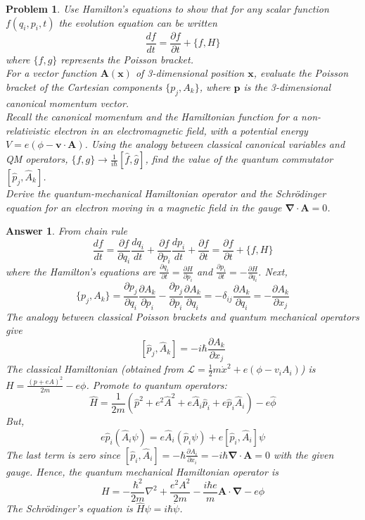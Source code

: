 \documentclass[a4paper]{article}
\newtheorem{ans}{Answer}[section]
\theoremstyle{new}
\newtheorem{qns}{Problem}[section]
\begin{document}
\begin{qns}
Use Hamilton’s equations to show that for any scalar function $f(q_i, p_i,t)$ the evolution equation can be written
$$\frac{df}{dt}=\frac{\partial f}{\partial t}+\{f,H\}$$
where $\{f,g\}$ represents the Poisson bracket.\\[5pt]
For a vector function $\mathbf{A}(\mathbf{x})$ of 3-dimensional position $\mathbf{x}$, evaluate the Poisson bracket of the Cartesian components $\{p_j,A_k\}$, where $\mathbf{p}$ is the 3-dimensional canonical momentum vector.\\[5pt]
Recall the canonical momentum and the Hamiltonian function for a non-relativistic electron in an electromagnetic field, with a potential energy $V=e(\phi-\mathbf{v}\cdot\mathbf{A})$. Using the analogy between classical canonical variables and QM operators, $\{f,g\}\rightarrow\frac{1}{i\hbar}[\hat{f},\hat{g}]$, find the value of the quantum commutator $[\hat{p}_j,\hat{A}_k]$.\\[5pt]
Derive the quantum-mechanical Hamiltonian operator and the Schr\"{o}dinger equation for an electron moving in a magnetic field in the gauge $\boldsymbol{\nabla}\cdot\mathbf{A}=0$.
\end{qns}
\begin{ans}
From chain rule
$$\frac{df}{dt}=\frac{\partial f}{\partial q_i}\frac{dq_i}{dt}+\frac{\partial f}{\partial p_i}\frac{dp_i}{dt}+\frac{\partial f}{\partial t}=\frac{\partial f}{\partial t}+\{f,H\}$$
where the Hamilton's equations are $\frac{\partial q_i}{\partial t}=\frac{\partial H}{\partial p_i}$ and $\frac{\partial p_i}{\partial t}=-\frac{\partial H}{\partial q_i}$. Next,
$$\{p_j,A_k\}=\frac{\partial p_j}{\partial q_i}\frac{\partial A_k}{\partial p_i}-\frac{\partial p_j}{\partial p_i}\frac{\partial A_k}{\partial q_i}=-\delta_{ij}\frac{\partial A_k}{\partial q_i}=-\frac{\partial A_k}{\partial x_j}$$
The analogy between classical Poisson brackets and quantum mechanical operators give
$$[\hat{p}_j,\hat{A}_k]=-i\hbar\frac{\partial A_k}{\partial x_j}$$
The classical Hamiltonian (obtained from $\mathcal{L}=\frac{1}{2}m\dot{x}^2+e(\phi-v_iA_i)$) is $H=\frac{(p+eA)^2}{2m}-e\phi$. Promote to quantum operators:
$$\hat{H}=\frac{1}{2m}(\hat{p}^2+e^2\hat{A}^2+e\hat{A}_i\hat{p}_i+e\hat{p}_i\hat{A}_i)-e\hat{\phi}$$
But,
$$e\hat{p}_i(\hat{A}_i\psi)=e\hat{A}_i(\hat{p}_i\psi)+e[\hat{p}_i,\hat{A}_i]\psi$$
The last term is zero since $[\hat{p}_i,\hat{A}_i]=-\hbar\frac{\partial A_i}{\partial x_i}=-i\hbar\boldsymbol{\nabla}\cdot\mathbf{A}=0$ with the given gauge. Hence, the quantum mechanical Hamiltonian operator is
$$H=-\frac{\hbar^2}{2m}\nabla^2+\frac{e^2A^2}{2m}-\frac{i\hbar e}{m}\mathbf{A}\cdot\boldsymbol{\nabla}-e\phi$$
The Schr\"{o}dinger's equation is $\hat{H}\psi=i\hbar\dot{\psi}$.
\end{ans}
\end{document}
